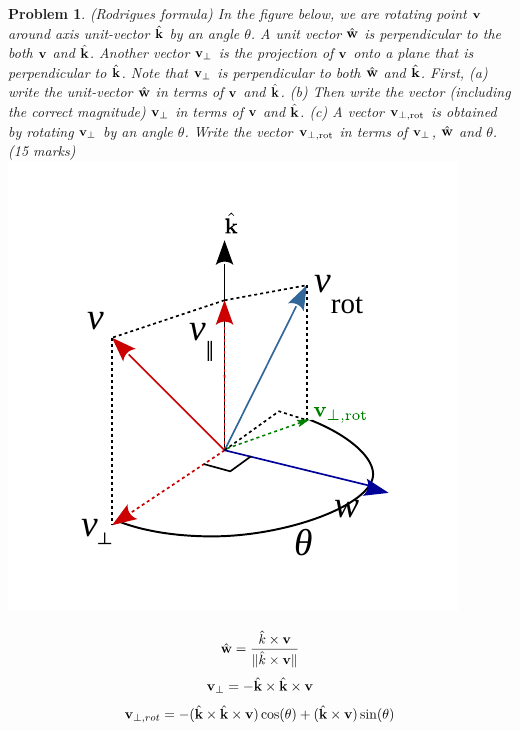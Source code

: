 \documentclass{article}
\newtheorem{prob}{Problem}
\begin{document}
\begin{prob}
  (Rodrigues formula) In the figure below, we are rotating point $\mathbf{v}$ around
  axis unit-vector $\hat{\mathbf{k}}$ by an angle $\theta$. A unit vector $\hat{\mathbf{w}}$ is
  perpendicular to the both $\mathbf{v}$ and $\hat{\mathbf{k}}$. Another vector $\mathbf{v}_{\perp}$ is the projection of $\mathbf{v}$ onto a plane that is perpendicular to $\hat{\mathbf{k}}$. Note that $\mathbf{v}_{\perp}$ is perpendicular to both $\hat{\mathbf{w}}$ and $\hat{\mathbf{k}}$. First, (a) write the
  unit-vector $\hat{\mathbf{w}}$ in terms of $\mathbf{v}$ and $\hat{\mathbf{k}}$.
  (b) Then write the vector (including the correct magnitude) $\mathbf{v}_\perp$ in terms of $\mathbf{v}$ and $\hat{\mathbf{k}}$.
  (c) A vector $\mathbf{v}_{\perp,\text{rot}}$ is obtained by rotating $\mathbf{v}_\perp$ by an angle $\theta$. Write the vector $\mathbf{v}_{\perp,\text{rot}}$ in terms of $\mathbf{v}_{\perp}$, $\hat{\mathbf{w}}$ and $\theta$. 
  (15 marks)\\
  \includegraphics[width=0.5\linewidth]{media/Rodrigues-formula.pdf}
\end{prob}
\begin{align}
  \hat{\mathbf{w}} = \frac{\hat{k} \times \mathbf{v}}{\|\hat{k} \times \mathbf{v}\|}
\end{align}
\begin{align}
\mathbf{v}_\perp = -\hat{\mathbf{k}} \times \hat{\mathbf{k}} \times \mathbf{v}
\end{align}
\begin{align}
  \mathbf{v}_{\perp,rot} = -(\hat{\mathbf{k}} \times \hat{\mathbf{k}} \times \mathbf{v}) \cos(\theta) +
  (\hat{\mathbf{k}} \times \mathbf{v}) \sin(\theta)
\end{align}


\newpage
\end{document}
